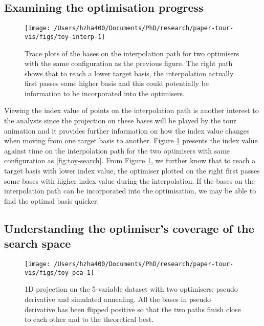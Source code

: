 \hypertarget{toy-interp}{%
\subsection{Examining the optimisation progress}\label{toy-interp}}

\begin{Schunk}
\begin{figure}

{\centering \texttt{[image: /Users/hzha400/Documents/PhD/research/paper-tour-vis/figs/toy-interp-1]} 

}

\caption[Trace plots of the bases on the interpolation path for two optimisers with the same configuration as the previous figure]{Trace plots of the bases on the interpolation path for two optimisers with the same configuration as the previous figure. The right path shows that to reach a lower target basis, the interpolation actually first passes some higher basis and this could potentially be information to be incorporated into the optimisers.}\label{fig:toy-interp}
\end{figure}
\end{Schunk}

Viewing the index value of points on the interpolation path is another
interest to the analysts since the projection on these bases will be
played by the tour animation and it provides further information on how
the index value changes when moving from one target basis to another.
Figure \ref{fig:toy-interp} presents the index value against time on the
interpolation path for the two optimisers with same configuration as
\ref{fig:toy-search}. From Figure \ref{fig:toy-interp}, we further know
that to reach a target basis with lower index value, the optimiser
plotted on the right first passes some bases with higher index value
during the interpolation. If the bases on the interpolation path can be
incorporated into the optimisation, we may be able to find the optimal
basis quicker.

\hypertarget{understanding-the-optimisers-coverage-of-the-search-space}{%
\subsection{Understanding the optimiser's coverage of the search
space}\label{understanding-the-optimisers-coverage-of-the-search-space}}

\begin{Schunk}
\begin{figure}

{\centering \texttt{[image: /Users/hzha400/Documents/PhD/research/paper-tour-vis/figs/toy-pca-1]} 

}

\caption[1D projection on the 5-variable dataset  with two optimisers]{1D projection on the 5-variable dataset  with two optimisers: pseudo derivative and simulated annealing. All the bases in pseudo derivative has been flipped positive so that the two paths finish close to each other and to the theoretical best.}\label{fig:toy-pca}
\end{figure}
\end{Schunk}

